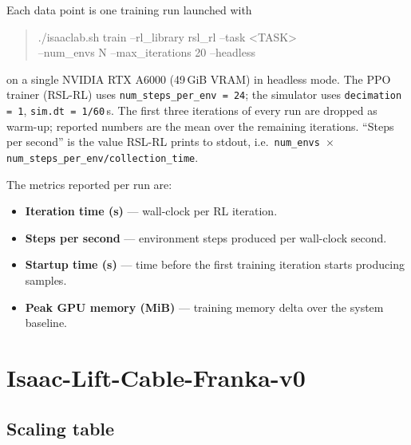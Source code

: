 \documentclass[a4paper,11pt]{article}
\newenvironment{reportcode}{%
  \vspace{0.2em}%
  \begin{quote}%
  \ttfamily\small%
}{%
  \end{quote}%
  \vspace{0.2em}%
}
\begin{document}
Each data point is one training run launched with
\begin{reportcode}
./isaaclab.sh train --rl\_library rsl\_rl --task <TASK>\\
\phantom{./isaaclab.sh train }--num\_envs N --max\_iterations 20 --headless
\end{reportcode}
on a single NVIDIA RTX A6000 (49\,GiB VRAM) in headless mode. The PPO trainer (RSL-RL) uses
\texttt{num\_steps\_per\_env = 24}; the simulator uses \texttt{decimation = 1},
\texttt{sim.dt = 1/60}\,s. The first three iterations of every run are dropped as warm-up; reported
numbers are the mean over the remaining iterations. ``Steps per second'' is the value RSL-RL prints
to stdout, i.e.\ \texttt{num\_envs $\times$ num\_steps\_per\_env/collection\_time}.

The metrics reported per run are:
\begin{itemize}[leftmargin=1.4em, itemsep=0.2em]
  \item \textbf{Iteration time (s)} --- wall-clock per RL iteration.
  \item \textbf{Steps per second} --- environment steps produced per wall-clock second.
  \item \textbf{Startup time (s)} --- time before the first training iteration starts producing samples.
  \item \textbf{Peak GPU memory (MiB)} --- training memory delta over the system baseline.
\end{itemize}

\section{Isaac-Lift-Cable-Franka-v0}

\subsection{Scaling table}
\end{document}
